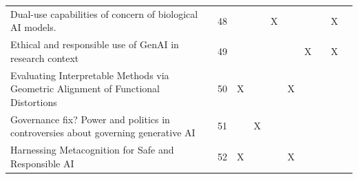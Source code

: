 \begin{landscape}
\begin{longtable}{|p{17cm}|c|c|c|c|c|c|c|c|c|}
		Dual-use capabilities of concern of biological AI models.                                                                                               & 48          &                                    &                                                           & X                                                     &                                                            &                                           &                                              & X                                                  &                                    \\
		Ethical and responsible use of GenAI in research context                                                                                                & 49          &                                    &                                                           &                                                       &                                                            & X                                         &                                              & X                                                  &                                    \\
		Evaluating Interpretable Methods via Geometric Alignment of Functional Distortions                                                                      & 50          & X                                  &                                                           &                                                       & X                                                          &                                           &                                              &                                                    &                                    \\
		Governance fix? Power and politics in controversies about governing generative AI                                                                       & 51          &                                    & X                                                         &                                                       &                                                            &                                           &                                              &                                                    &                                    \\
		Harnessing Metacognition for Safe and Responsible AI                                                                                                    & 52          & X                                  &                                                           &                                                       & X                                                          &                                           &                                              &                                                    &                                    \\

\end{longtable}
\end{landscape}
